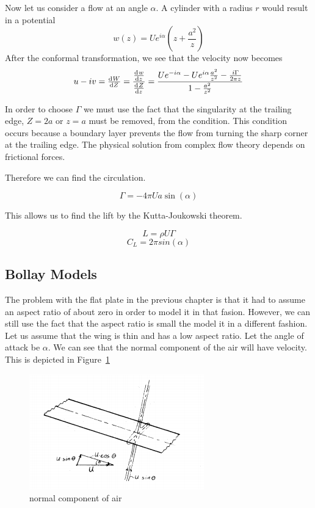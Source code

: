 Now let us consider a flow at an angle $\alpha$. A cylinder with a radius $r$
would result in a potential
\[w(z) = Ue^{i\alpha}(z + \frac{a^2}{z}) \]
After the conformal transformation, we see that the velocity now becomes
\[u - iv = \od{W}{Z} = \frac{\od{w}{z}}{\od{Z}{z}} = \frac{Ue^{-i\alpha}-Ue^{i\alpha}\frac{a^2}{z^2}
- \frac{i \Gamma}{2\pi z}}{1 - \frac{a^2}{z^2}}\]

In order to choose $\Gamma$ we must use the fact that the singularity at the trailing edge, 
$Z=2a$ or $z=a$ must be removed, from the condition. This condition occurs because 
a boundary layer prevents the flow from turning the sharp corner at the trailing edge.
The physical solution from complex flow theory depends on frictional forces.

Therefore we can find the circulation.

\[ \Gamma = -4\pi Ua \sin(\alpha) \]

This allows us to find the lift by the Kutta-Joukowski theorem.

\[L = \rho U \Gamma\]
\begin{equation}
\label{eq:flat_plat_cl}
C_L = 2\pi sin(\alpha)
\end{equation}


\subsection{Bollay Models}

The problem with the flat plate in the previous chapter is that it had to assume 
an aspect ratio of about zero in order to model it in that fasion. However, we can still
use the fact that the aspect ratio is small the model it in a different fashion.
Let us assume that the wing is thin and has a low aspect ratio. Let the angle of attack
 be $\alpha$. We can see that the normal component of the air
will have velocity. This is depicted in Figure~\ref{fig:bollay1}

\begin{figure}[hl]
  \centering
    \includegraphics[scale=1]{figures/bollay1.png}
    \caption{normal component of air}
  \label{fig:bollay1}
\end{figure}


